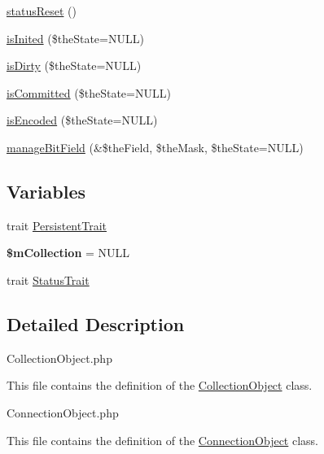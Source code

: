 \begin{DoxyCompactItemize}
\item 
\hyperlink{namespace_ontology_wrapper_a280161e55061a555db16bced32d874f4}{status\-Reset} ()
\item 
\hyperlink{namespace_ontology_wrapper_a7c06300cb0043d3bab108f92cb9be3db}{is\-Inited} (\$the\-State=N\-U\-L\-L)
\item 
\hyperlink{namespace_ontology_wrapper_ad6a1ce4470a565eb806bf842a2b38aaf}{is\-Dirty} (\$the\-State=N\-U\-L\-L)
\item 
\hyperlink{namespace_ontology_wrapper_a76edb24c245971fe5fdb3163a6d947b0}{is\-Committed} (\$the\-State=N\-U\-L\-L)
\item 
\hyperlink{namespace_ontology_wrapper_a401cbd03af9cceba713ab3e824c8fa98}{is\-Encoded} (\$the\-State=N\-U\-L\-L)
\item 
\hyperlink{namespace_ontology_wrapper_a3cfa12fdda8882e52b7184635d8dd3fc}{manage\-Bit\-Field} (\&\$the\-Field, \$the\-Mask, \$the\-State=N\-U\-L\-L)
\end{DoxyCompactItemize}
\subsection*{Variables}
\begin{DoxyCompactItemize}
\item 
trait \hyperlink{namespace_ontology_wrapper_aad152394da45245f97951e27b3e564ca}{Persistent\-Trait}
\item 
\hypertarget{namespace_ontology_wrapper_a3f7c249128573c15c10e6cb27ed9e85b}{{\bfseries \$m\-Collection} = N\-U\-L\-L}\label{namespace_ontology_wrapper_a3f7c249128573c15c10e6cb27ed9e85b}

\item 
trait \hyperlink{namespace_ontology_wrapper_a3f5950ec516e30934eda786dd2f93a5f}{Status\-Trait}
\end{DoxyCompactItemize}


\subsection{Detailed Description}
Collection\-Object.\-php

This file contains the definition of the \hyperlink{class_ontology_wrapper_1_1_collection_object}{Collection\-Object} class.

Connection\-Object.\-php

This file contains the definition of the \hyperlink{class_ontology_wrapper_1_1_connection_object}{Connection\-Object} class.


